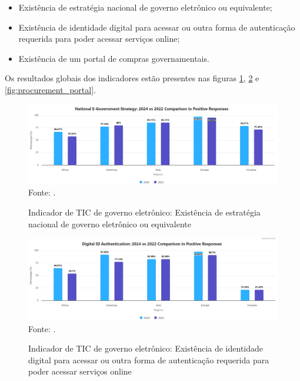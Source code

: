 \begin{itemize}
	\item Existência de estratégia nacional de governo eletrônico ou equivalente;
	\item Existência de identidade digital para acessar ou outra forma de autenticação requerida para poder acessar serviços online;
	\item Existência de um portal de compras governamentais.
\end{itemize}

Os resultados globais dos indicadores estão presentes nas figuras \ref{fig:national_government_strategy}, \ref{fig:national_identity} e \ref{fig:procurement_portal}.

\begin{figure}[H]
	\centering
	\caption{Indicador de TIC de governo eletrônico: Existência de estratégia nacional de governo eletrônico ou equivalente}
	\includegraphics[width=1\linewidth]{figuras/national_government_strategy}
	\label{fig:national_government_strategy}
	\footnotesize{Fonte: \cite{ONU_ICT_in_government_indicators}.}
\end{figure}

\begin{figure}[H]
	\centering
	\caption{Indicador de TIC de governo eletrônico: Existência de identidade digital para acessar ou outra forma de autenticação requerida para poder acessar serviços online}
	\includegraphics[width=1\linewidth]{figuras/digital_identity}
	\label{fig:national_identity}
	\footnotesize{Fonte: \cite{ONU_ICT_in_government_indicators}.}
\end{figure}

